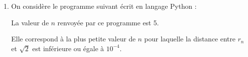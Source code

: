 \begin{enumerate}
\begin{enumerate}
$r_{n+1}=\dfrac{v_{n+1}}{u_{n+1}} = \dfrac{2u_n + v_n}{u_n+v_n}
=\dfrac{u_n\left (2+\dfrac{v_n}{u_n}\right )}{u_n \left ( 1+\dfrac{v_n}{u_n}\right )}		
=\dfrac{2+\dfrac{v_n}{u_n}}{ 1+\dfrac{v_n}{u_n}}		
 = \dfrac{2 + r_n}{1 + r_n}$.

		\item On considère le programme suivant écrit en langage Python :
		
\begin{center}
\end{center}





La valeur de $n$ renvoyée par ce programme est 5.



Elle correspond à  la plus petite valeur de $n$ pour laquelle la distance entre $r_n$ et $\sqrt{2}$ est inférieure ou égale à  $10^{-4}$.

	\end{enumerate}
\end{enumerate}

\bigskip
